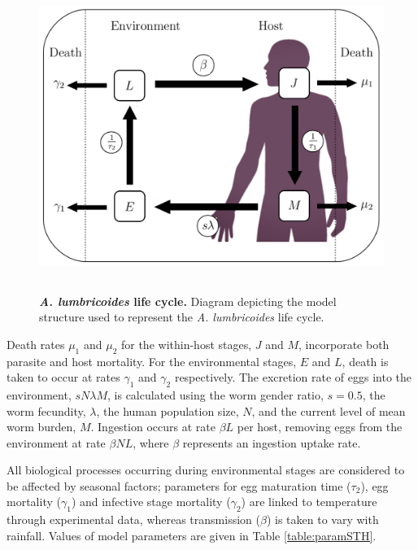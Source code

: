 \begin{figure}[h!]
\includegraphics[height=10cm]{Project/Figures/STH/Fig1.pdf}
\caption[\textit{A. lumbricoides} life cycle diagram.]{{\bf \textit{A. lumbricoides} life cycle.} Diagram depicting the model structure used to represent the \textit{A. lumbricoides} life cycle.}
\label{Fig1}
\end{figure}

Death rates $\mu_1$ and $\mu_2$ for the within-host stages, $J$ and $M$, incorporate both parasite and host mortality. For the environmental stages, $E$ and $L$, death is taken to occur at rates $\gamma_1$ and $\gamma_2$ respectively. The excretion rate of eggs into the environment, $sN\lambda M$, is calculated using the worm gender ratio, $s=0.5$, the worm fecundity, $\lambda$, the human population size, $N$, and the current level of mean worm burden, $M$. Ingestion occurs at rate $\beta L$ per host, removing eggs from the environment at rate $\beta NL$, where $\beta$ represents an ingestion uptake rate. 

All biological processes occurring during environmental stages are considered to be affected by seasonal factors; parameters for egg maturation time ($\tau_2$), egg mortality ($\gamma_1$) and infective stage mortality ($\gamma_2$) are linked to temperature through experimental data, whereas transmission ($\beta$) is taken to vary with rainfall. Values of model parameters are given in Table \ref{table:paramSTH}.

